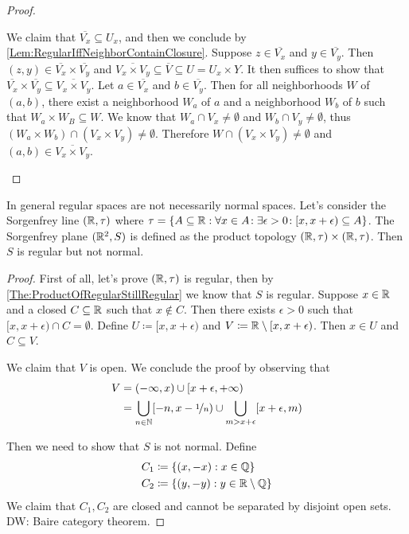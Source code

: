 \documentclass[screen]{techreport}
\numberwithin{equation}{section}
\newcommand{\diw}[1]{{\color{Red} DW: #1}}
\begin{document}
\begin{proof}
\begin{itemize}
		We claim that $\overline{V_x} \subseteq U_x$, and then we conclude by \cref{Lem:RegularIffNeighborContainClosure}.
		Suppose $z \in \overline{V_x}$ and $y \in \overline{V_y}$.
		Then $(z,y) \in \overline{V_x} \times \overline{V_y}$ and $\overline{V_x \times V_y} \subseteq \overline{V} \subseteq U = U_x \times Y$.
		It then suffices to show that $\overline{V_x} \times \overline{V_y} \subseteq \overline{V_x \times V_y}$.
		Let $a \in \overline{V_x}$ and $b \in \overline{V_y}$.
		Then for all neighborhoods $W$ of $(a,b)$, there exist a neighborhood $W_a$ of $a$ and a neighborhood $W_b$ of $b$ such that $W_a \times W_B \subseteq W$.
		We know that $W_a \cap V_x \neq \emptyset$ and $W_b \cap V_y \neq \emptyset$,
		thus $(W_a \times W_b) \cap (V_x \times V_y) \neq \emptyset$.
		Therefore $W \cap (V_x \times V_y) \neq \emptyset$ and $(a,b) \in \overline{V_x\times V_y}$.
	\end{itemize}
\end{proof}

\begin{example}\label{Exa:RegularNotImplyNormal}
	In general regular spaces are not necessarily normal spaces.
	Let's consider the Sorgenfrey line $(\mathbb{R},\tau)$ where $\tau = \{ A \subseteq \mathbb{R} : \forall {x \in A}\!: \exists {\epsilon > 0}\!: [x,x+\epsilon) \subseteq A \}$.
	The Sorgenfrey plane $(\mathbb{R}^2,S)$ is defined as the product topology $(\mathbb{R},\tau) \times (\mathbb{R},\tau)$.
	Then $S$ is regular but not normal.
\end{example}
\begin{proof}
	First of all, let's prove $(\mathbb{R},\tau)$ is regular, then by \cref{The:ProductOfRegularStillRegular} we know that $S$ is regular.
	Suppose $x \in \mathbb{R}$ and a closed $C \subseteq \mathbb{R}$ such that $x \not\in C$.
	Then there exists $\epsilon>0$ such that $[x,x+\epsilon) \cap C = \emptyset$.
	Define $U \coloneqq [x,x+\epsilon)$ and $V \coloneqq \mathbb{R} \setminus [x,x+\epsilon)$.
	Then $x \in U$ and $C \subseteq V$.
	
	We claim that $V$ is open. We conclude the proof by observing that
	\begin{align*}
		V & = (-\infty,x) \cup [x+\epsilon,+\infty) \\
		& = \bigcup_{n \in \mathbb{N}} [-n, x-\nicefrac{1}{n}) \cup \bigcup_{m > x + \epsilon} [x+\epsilon,m)
	\end{align*}
	
	Then we need to show that $S$ is not normal.
	Define
	\begin{align*}
		C_1 & \coloneqq \{ (x,-x) : x \in \mathbb{Q} \} \\
		C_2 & \coloneqq \{ (y,-y) : y \in \mathbb{R} \setminus \mathbb{Q} \}
	\end{align*}
	We claim that $C_1,C_2$ are closed and cannot be separated by disjoint open sets.
	\diw{Baire category theorem.}
\end{proof}
\end{document}
